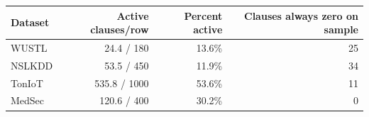 \begin{tabular}{lrrr}
\toprule
Dataset & Active clauses/row & Percent active & Clauses always zero on sample \\
\midrule
WUSTL & 24.4 / 180 & 13.6\% & 25 \\
NSLKDD & 53.5 / 450 & 11.9\% & 34 \\
TonIoT & 535.8 / 1000 & 53.6\% & 11 \\
MedSec & 120.6 / 400 & 30.2\% & 0 \\
\bottomrule
\end{tabular}
